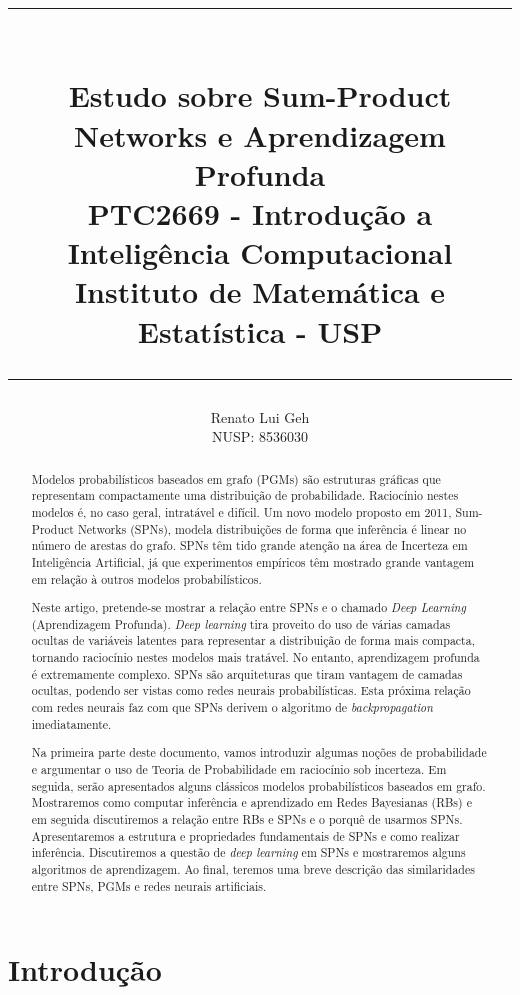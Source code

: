 \documentclass{amsart}
\title{%
  \noindent\rule{10cm}{0.8pt}\\
  Estudo sobre Sum-Product Networks e Aprendizagem Profunda\\[1ex]
  \scriptsize\mdseries
  PTC2669 - Introdução a Inteligência Computacional\\
  Instituto de Matemática e Estatística - USP\\%
  \noindent\rule{10cm}{0.8pt}
}
\author[]{Renato Lui Geh\\NUSP\@: 8536030}
\theoremstyle{plain}
\numberwithin{equation}{subsection}
\begin{document}
\begin{abstract}
  Modelos probabilísticos baseados em grafo (PGMs) são estruturas gráficas que representam
  compactamente uma distribuição de probabilidade. Raciocínio nestes modelos é, no caso geral,
  intratável e difícil. Um novo modelo proposto em 2011, Sum-Product Networks (SPNs), modela
  distribuições de forma que inferência é linear no número de arestas do grafo. SPNs têm tido
  grande atenção na área de Incerteza em Inteligência Artificial, já que experimentos empíricos têm
  mostrado grande vantagem em relação à outros modelos probabilísticos.

  Neste artigo, pretende-se mostrar a relação entre SPNs e o chamado \textit{Deep Learning}
  (Aprendizagem Profunda). \textit{Deep learning} tira proveito do uso de várias camadas ocultas de
  variáveis latentes para representar a distribuição de forma mais compacta, tornando raciocínio
  nestes modelos mais tratável. No entanto, aprendizagem profunda é extremamente complexo. SPNs são
  arquiteturas que tiram vantagem de camadas ocultas, podendo ser vistas como redes neurais
  probabilísticas. Esta próxima relação com redes neurais faz com que SPNs derivem o algoritmo de
  \textit{backpropagation} imediatamente.

  Na primeira parte deste documento, vamos introduzir algumas noções de probabilidade e argumentar
  o uso de Teoria de Probabilidade em raciocínio sob incerteza. Em seguida, serão apresentados
  alguns clássicos modelos probabilísticos baseados em grafo. Mostraremos como computar inferência
  e aprendizado em Redes Bayesianas (RBs) e em seguida discutiremos a relação entre RBs e SPNs e o
  porquê de usarmos SPNs. Apresentaremos a estrutura e propriedades fundamentais de SPNs e como
  realizar inferência. Discutiremos a questão de \textit{deep learning} em SPNs e mostraremos
  alguns algoritmos de aprendizagem. Ao final, teremos uma breve descrição das similaridades entre
  SPNs, PGMs e redes neurais artificiais.

  \vspace*{-2.5em}
\end{abstract}

\maketitle

\section{Introdução}
\end{document}
